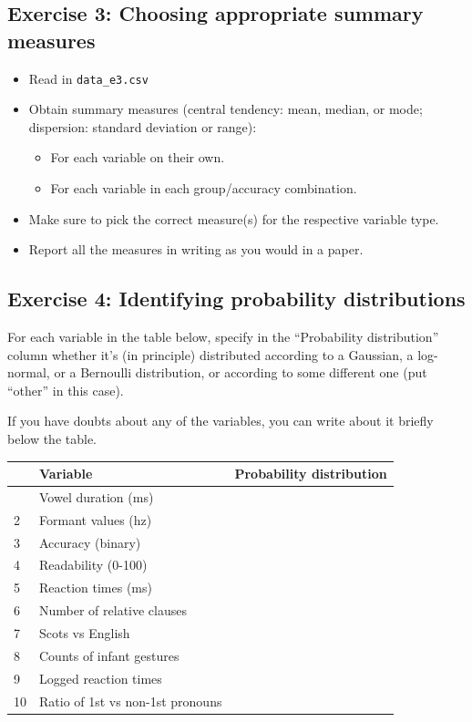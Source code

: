 \documentclass[
]{article}
\providecommand{\tightlist}{%
  \setlength{\itemsep}{0pt}\setlength{\parskip}{0pt}}
\begin{document}
\newpage

\subsection{Exercise 3: Choosing appropriate summary
measures}\label{exercise-3-choosing-appropriate-summary-measures}

\begin{itemize}
\tightlist
\item
  Read in \texttt{data\_e3.csv}
\item
  Obtain summary measures (central tendency: mean, median, or mode;
  dispersion: standard deviation or range):

  \begin{itemize}
  \tightlist
  \item
    For each variable on their own.
  \item
    For each variable in each group/accuracy combination.
  \end{itemize}
\item
  Make sure to pick the correct measure(s) for the respective variable
  type.
\item
  Report all the measures in writing as you would in a paper.
\end{itemize}

\newpage

\subsection{Exercise 4: Identifying probability
distributions}\label{exercise-4-identifying-probability-distributions}

For each variable in the table below, specify in the ``Probability
distribution'' column whether it's (in principle) distributed according
to a Gaussian, a log-normal, or a Bernoulli distribution, or according
to some different one (put ``other'' in this case).

If you have doubts about any of the variables, you can write about it
briefly below the table.

\begin{longtable}[]{@{}lll@{}}
\toprule\noalign{}
& Variable & Probability distribution \\
\midrule\noalign{}
\endhead
\bottomrule\noalign{}
\endlastfoot
1 & Vowel duration (ms) & \\
2 & Formant values (hz) & \\
3 & Accuracy (binary) & \\
4 & Readability (0-100) & \\
5 & Reaction times (ms) & \\
6 & Number of relative clauses & \\
7 & Scots vs English & \\
8 & Counts of infant gestures & \\
9 & Logged reaction times & \\
10 & Ratio of 1st vs non-1st pronouns & \\
\end{longtable}
\end{document}
